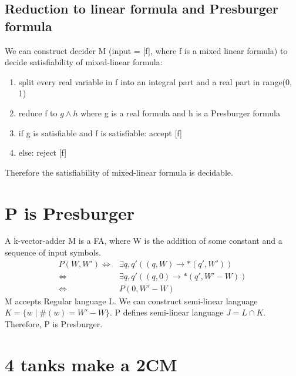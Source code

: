 \documentclass{article}
\begin{document}
\subsection{Reduction to linear formula and Presburger formula}
We can construct decider M (input = [f], where f is a mixed linear formula) to 
decide satisfiability of mixed-linear formula:
\begin{enumerate}
	\item split every real variable in f into an integral part and a real 
	part in range(0, 1)
	\item reduce f to $ g \land h $ where g is a real formula and h is a 
	Presburger formula
	\item if g is satisfiable and f is satisfiable: accept [f]
	\item else: reject [f]
\end{enumerate}
Therefore the satisfiability of mixed-linear formula is decidable.

\section{P is Presburger}
A k-vector-adder M is a FA, where W is the addition of some constant and a 
sequence of input symbols.
\begin{align*}
	P(W, W')
	\iff& \exists q, q' ((q, W) \rightarrow* (q', W'))\\
	\iff& \exists q, q' ((q, 0) \rightarrow* (q', W'-W))\\
	\iff& P(0, W' - W)
\end{align*}
M accepts Regular language L. We can construct semi-linear language $ K = \{w 
\mid \#(w) = W'-W\} $. P defines semi-linear language $ J = L \cap K $. 
Therefore, P is Presburger.

\section{4 tanks make a 2CM}
\end{document}
